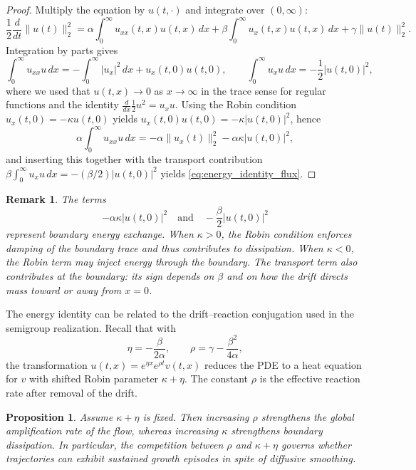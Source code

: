 \documentclass[12pt]{article}
\newtheorem{proposition}[theorem]{Proposition}
\newtheorem{remark}[theorem]{Remark}
\begin{document}
\begin{proof}
Multiply the equation by $u(t,\cdot)$ and integrate over $(0,\infty)$:
\[
\frac{1}{2}\frac{d}{dt}\|u(t)\|_2^2
=
\alpha\int_0^\infty u_{xx}(t,x)u(t,x)\,dx
+\beta\int_0^\infty u_x(t,x)u(t,x)\,dx
+\gamma\|u(t)\|_2^2.
\]
Integration by parts gives
\[
\int_0^\infty u_{xx}u\,dx
=
-\int_0^\infty |u_x|^2\,dx+u_x(t,0)u(t,0),
\qquad
\int_0^\infty u_xu\,dx
=
-\frac{1}{2}|u(t,0)|^2,
\]
where we used that $u(t,x)\to0$ as $x\to\infty$ in the trace sense for regular functions and the identity $\frac{d}{dx}\frac{1}{2}u^2=u_xu$. Using the Robin condition $u_x(t,0)=-\kappa u(t,0)$ yields
$u_x(t,0)u(t,0)=-\kappa |u(t,0)|^2$, hence
\[
\alpha\int_0^\infty u_{xx}u\,dx
=
-\alpha\|u_x(t)\|_2^2-\alpha\kappa|u(t,0)|^2,
\]
and inserting this together with the transport contribution
$\beta\int_0^\infty u_xu\,dx=-(\beta/2)|u(t,0)|^2$ yields \eqref{eq:energy_identity_flux}.
\end{proof}

\begin{remark}\label{rem:boundary_flux_meaning}
The terms
\[
-\alpha\kappa |u(t,0)|^2
\quad\text{and}\quad
-\frac{\beta}{2}|u(t,0)|^2
\]
represent boundary energy exchange. When $\kappa>0$, the Robin condition enforces damping of the boundary trace and thus contributes to dissipation. When $\kappa<0$, the Robin term may inject energy through the boundary. The transport term also contributes at the boundary: its sign depends on $\beta$ and on how the drift directs mass toward or away from $x=0$.
\end{remark}

The energy identity can be related to the drift--reaction conjugation used in the semigroup realization. Recall that with
\[
\eta=-\frac{\beta}{2\alpha},
\qquad
\rho=\gamma-\frac{\beta^2}{4\alpha},
\]
the transformation $u(t,x)=e^{\eta x}e^{\rho t}v(t,x)$ reduces the PDE to a heat equation for $v$ with shifted Robin parameter $\kappa+\eta$. The constant $\rho$ is the effective reaction rate after removal of the drift.

\begin{proposition}\label{prop:effective_reaction_energy}
Assume $\kappa+\eta$ is fixed. Then increasing $\rho$ strengthens the global amplification rate of the flow, whereas increasing $\kappa$ strengthens boundary dissipation. In particular, the competition between $\rho$ and $\kappa+\eta$ governs whether trajectories can exhibit sustained growth episodes in spite of
diffusive smoothing.
\end{proposition}
\end{document}
